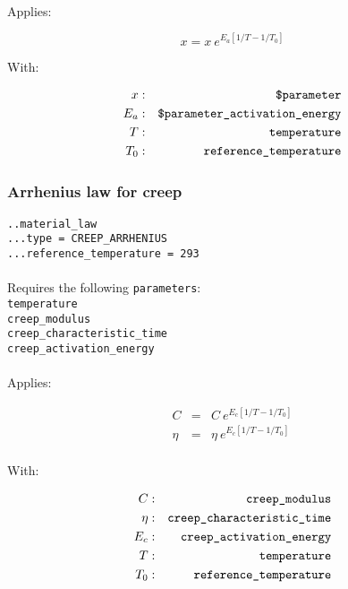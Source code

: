 \documentclass[10pt]{article}
\begin{document}
\paragraph{}Applies:

\begin{equation}
	x = x\ e^{E_a \left[ 1/T - 1/T_0 \right]}
\end{equation}

With:

\begin{eqnarray}
	x & : & \verb+$parameter+ \notag \\
	E_a & : & \verb+$parameter_activation_energy+\notag  \\
	T & : & \verb+temperature+ \notag \\
	T_0 & : & \verb+reference_temperature+ \notag 
\end{eqnarray}

\subsubsection{Arrhenius law for creep}

\noindent \verb+..material_law+\\
\verb+...type = CREEP_ARRHENIUS+\\
\verb+...reference_temperature = 293+

\paragraph{}Requires the following \verb+parameters+:\\

\noindent \verb+temperature+\\
\verb+creep_modulus+\\
\verb+creep_characteristic_time+\\
\verb+creep_activation_energy+

\paragraph{}Applies:

\begin{eqnarray}
	C & = & C\ e^{E_c \left[ 1/T - 1/T_0 \right]} \\
	\eta & = & \eta\ e^{E_c \left[ 1/T - 1/T_0 \right]} \\
\end{eqnarray}

With:

\begin{eqnarray}
	C & : & \verb+creep_modulus+ \notag \\
	\eta & : & \verb+creep_characteristic_time+ \notag \\
	E_c & : & \verb+creep_activation_energy+\notag  \\
	T & : & \verb+temperature+ \notag \\
	T_0 & : & \verb+reference_temperature+ \notag 
\end{eqnarray}
\end{document}
